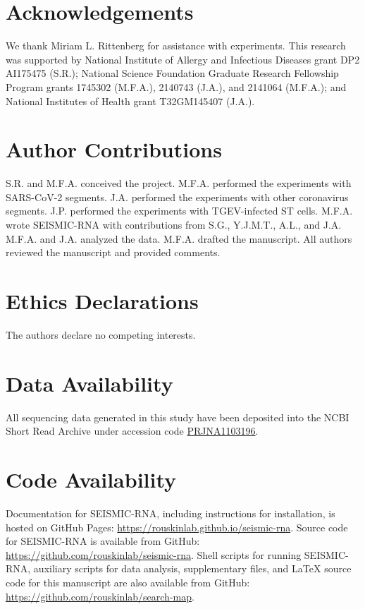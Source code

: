 \documentclass[main.tex]{subfiles}
\begin{document}
\section{Acknowledgements}

We thank Miriam L. Rittenberg for assistance with experiments. 
This research was supported by National Institute of Allergy and Infectious Diseases grant DP2 AI175475 (S.R.); National Science Foundation Graduate Research Fellowship Program grants 1745302 (M.F.A.), 2140743 (J.A.), and 2141064 (M.F.A.); and National Institutes of Health grant T32GM145407 (J.A.).


\section{Author Contributions}

S.R. and M.F.A. conceived the project.
M.F.A. performed the experiments with SARS-CoV-2 segments.
J.A. performed the experiments with other coronavirus segments.
J.P. performed the experiments with TGEV-infected ST cells.
M.F.A. wrote SEISMIC-RNA with contributions from S.G., Y.J.M.T., A.L., and J.A.
M.F.A. and J.A. analyzed the data.
M.F.A. drafted the manuscript.
All authors reviewed the manuscript and provided comments.


\section{Ethics Declarations}

The authors declare no competing interests.


\section{Data Availability}

All sequencing data generated in this study have been deposited into the NCBI Short Read Archive under accession code \href{https://www.ncbi.nlm.nih.gov/bioproject/PRJNA1103196}{PRJNA1103196}.


\section{Code Availability}

Documentation for SEISMIC-RNA, including instructions for installation, is hosted on GitHub Pages: \url{https://rouskinlab.github.io/seismic-rna}.
Source code for SEISMIC-RNA is available from GitHub: \url{https://github.com/rouskinlab/seismic-rna}. 
Shell scripts for running SEISMIC-RNA, auxiliary scripts for data analysis, supplementary files, and LaTeX source code for this manuscript are also available from GitHub: \url{https://github.com/rouskinlab/search-map}.
\end{document}
